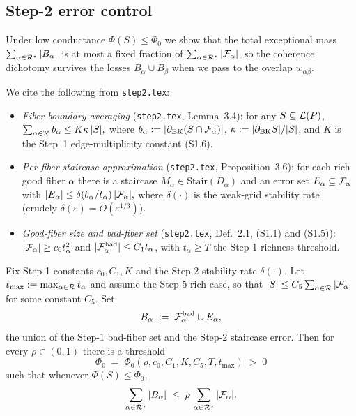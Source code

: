 \subsection{Step-2 error control}\label{sec:gap-error}

Under low conductance $\Phi(S)\le\Phi_0$ we show that the total
exceptional mass $\sum_{\alpha\in\mathcal{R}^\star} |B_\alpha|$ is at most a
fixed fraction of $\sum_{\alpha\in\mathcal{R}^\star}|\mathcal{F}_{\alpha}|$, so the
coherence dichotomy survives the losses $B_\alpha\cup B_\beta$ when we
pass to the overlap $w_{\alpha\beta}$.

We cite the following from \texttt{step2.tex}:
\begin{itemize}[nosep]
  \item[(F1)] \emph{Fiber boundary averaging}
    (\texttt{step2.tex}, Lemma~3.4): for any $S\subseteq\mathcal{L}(P)$,
    \(\sum_{\alpha\in\mathcal{R}}b_\alpha\le K\kappa\,|S|,\)
    where $b_\alpha:=|\partial_{\mathrm{BK}}(S\cap\mathcal{F}_{\alpha})|$,
    $\kappa:=|\partial_{\mathrm{BK}}S|/|S|$, and $K$ is the Step~1
    edge-multiplicity constant (S1.6).
  \item[(F2)] \emph{Per-fiber staircase approximation}
    (\texttt{step2.tex}, Proposition~3.6): for each rich good fiber
    $\alpha$ there is a staircase $M_\alpha\in\mathrm{Stair}(D_\alpha)$
    and an error set $E_\alpha\subseteq\mathcal{F}_{\alpha}$ with
    \(|E_\alpha|\le\delta(b_\alpha/t_\alpha)\,|\mathcal{F}_{\alpha}|,\)
    where $\delta(\cdot)$ is the weak-grid stability rate
    (crudely $\delta(\varepsilon)=O(\varepsilon^{1/3})$).
  \item[(F3)] \emph{Good-fiber size and bad-fiber set}
    (\texttt{step2.tex}, Def.~2.1, (S1.1) and (S1.5)):
    $|\mathcal{F}_{\alpha}|\ge c_0 t_\alpha^2$ and
    $|\mathcal{F}_{\alpha}^{\mathrm{bad}}|\le C_1 t_\alpha$, with $t_\alpha\ge T$
    the Step-1 richness threshold.
\end{itemize}

\begin{proposition}\label{prop:gap-g1}
Fix Step-1 constants $c_0,C_1,K$ and the Step-2 stability rate
$\delta(\cdot)$.  Let $t_{\max}:=\max_{\alpha\in\mathcal{R}}t_\alpha$ and
assume the Step-5 rich case, so that $|S|\le C_5
\sum_{\alpha\in\mathcal{R}}|\mathcal{F}_{\alpha}|$ for some constant $C_5$.  Set
\[
B_\alpha\;:=\;\mathcal{F}_{\alpha}^{\mathrm{bad}}\cup E_\alpha,
\]
the union of the Step-1 bad-fiber set and the Step-2 staircase error.
Then for every $\rho\in(0,1)$ there is a threshold
\[
\Phi_0
 \;=\;\Phi_0(\rho,c_0,C_1,K,C_5,T,t_{\max})\;>\;0
\]
such that whenever $\Phi(S)\le\Phi_0$,
\[
\sum_{\alpha\in\mathcal{R}^\star}|B_\alpha|
 \;\le\;\rho\,\sum_{\alpha\in\mathcal{R}^\star}|\mathcal{F}_{\alpha}|.
\]
\end{proposition}

